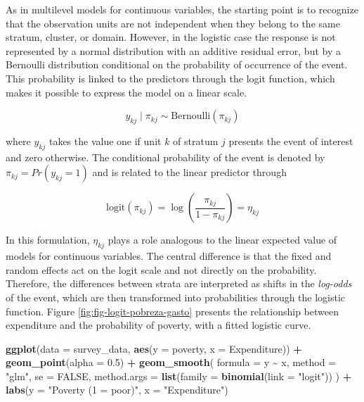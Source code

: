 \documentclass[
  english,
  12pt,
]{book}
\newenvironment{Shaded}{\begin{snugshade}}{\end{snugshade}}
\newcommand{\AttributeTok}[1]{\textcolor[rgb]{0.13,0.29,0.53}{#1}}
\newcommand{\ConstantTok}[1]{\textcolor[rgb]{0.56,0.35,0.01}{#1}}
\newcommand{\FloatTok}[1]{\textcolor[rgb]{0.00,0.00,0.81}{#1}}
\newcommand{\FunctionTok}[1]{\textcolor[rgb]{0.13,0.29,0.53}{\textbf{#1}}}
\newcommand{\NormalTok}[1]{#1}
\newcommand{\SpecialCharTok}[1]{\textcolor[rgb]{0.81,0.36,0.00}{\textbf{#1}}}
\newcommand{\StringTok}[1]{\textcolor[rgb]{0.31,0.60,0.02}{#1}}
\begin{document}
As in multilevel models for continuous variables, the starting point is to recognize that the observation units are not independent when they belong to the same stratum, cluster, or domain. However, in the logistic case the response is not represented by a normal distribution with an additive residual error, but by a Bernoulli distribution conditional on the probability of occurrence of the event. This probability is linked to the predictors through the logit function, which makes it possible to express the model on a linear scale.

\[
y_{kj} \mid \pi_{kj} \sim \text{Bernoulli}(\pi_{kj})
\]

where \(y_{kj}\) takes the value one if unit \(k\) of stratum \(j\) presents the event of interest and zero otherwise. The conditional probability of the event is denoted by \(\pi_{kj}=Pr(y_{kj}=1)\) and is related to the linear predictor through

\[
\text{logit}(\pi_{kj}) =
\log\left(\frac{\pi_{kj}}{1-\pi_{kj}}\right)
= \eta_{kj}
\]

In this formulation, \(\eta_{kj}\) plays a role analogous to the linear expected value of models for continuous variables. The central difference is that the fixed and random effects act on the logit scale and not directly on the probability. Therefore, the differences between strata are interpreted as shifts in the \emph{log-odds} of the event, which are then transformed into probabilities through the logistic function. Figure \ref{fig:fig-logit-pobreza-gasto} presents the relationship between expenditure and the probability of poverty, with a fitted logistic curve.

\begin{Shaded}
\begin{Highlighting}[]
\FunctionTok{ggplot}\NormalTok{(}\AttributeTok{data =}\NormalTok{ survey\_data,}
       \FunctionTok{aes}\NormalTok{(}\AttributeTok{y =}\NormalTok{ poverty, }\AttributeTok{x =}\NormalTok{ Expenditure)) }\SpecialCharTok{+}
  \FunctionTok{geom\_point}\NormalTok{(}\AttributeTok{alpha =} \FloatTok{0.5}\NormalTok{) }\SpecialCharTok{+}
  \FunctionTok{geom\_smooth}\NormalTok{(}
    \AttributeTok{formula =}\NormalTok{ y }\SpecialCharTok{\textasciitilde{}}\NormalTok{ x,}
    \AttributeTok{method =} \StringTok{"glm"}\NormalTok{,}
    \AttributeTok{se =} \ConstantTok{FALSE}\NormalTok{,}
    \AttributeTok{method.args =} \FunctionTok{list}\NormalTok{(}\AttributeTok{family =} \FunctionTok{binomial}\NormalTok{(}\AttributeTok{link =} \StringTok{"logit"}\NormalTok{))}
\NormalTok{  ) }\SpecialCharTok{+}
  \FunctionTok{labs}\NormalTok{(}\AttributeTok{y =} \StringTok{"Poverty (1 = poor)"}\NormalTok{, }\AttributeTok{x =} \StringTok{"Expenditure"}\NormalTok{)}
\end{Highlighting}
\end{Shaded}
\end{document}
